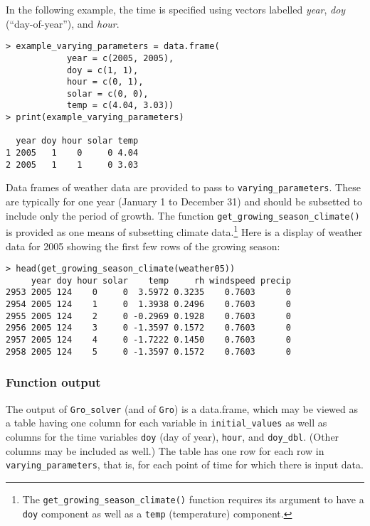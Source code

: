 \documentclass{article}
\newcommand{\code}[1]{\texttt{#1}}
\begin{document}
In the following example, the time is specified using vectors labelled
\emph{year}, \emph{doy} (``day-of-year''), and \emph{hour}.

\begin{center}
\begin{lstlisting}
> example_varying_parameters = data.frame(
            year = c(2005, 2005),
            doy = c(1, 1),
            hour = c(0, 1), 
            solar = c(0, 0),
            temp = c(4.04, 3.03))
> print(example_varying_parameters)

  year doy hour solar temp
1 2005   1    0     0 4.04
2 2005   1    1     0 3.03
\end{lstlisting}
\end{center}

Data frames of weather data are provided to pass to
\code{varying\_parameters}. These are typically for one year (January
1 to December 31) and should be subsetted to include only the period
of growth.  The function \code{get\_growing\_season\_climate()} is
provided as one means of subsetting climate data.\footnote{The
  \code{get\_growing\_season\_climate()} function requires its
  argument to have a \code{doy} component as well as a \code{temp}
  (temperature) component.}  Here is a display of weather data for
2005 showing the first few rows of the growing season:

\begin{center}
\begin{lstlisting}
> head(get_growing_season_climate(weather05))
     year doy hour solar    temp     rh windspeed precip
2953 2005 124    0     0  3.5972 0.3235    0.7603      0
2954 2005 124    1     0  1.3938 0.2496    0.7603      0
2955 2005 124    2     0 -0.2969 0.1928    0.7603      0
2956 2005 124    3     0 -1.3597 0.1572    0.7603      0
2957 2005 124    4     0 -1.7222 0.1450    0.7603      0
2958 2005 124    5     0 -1.3597 0.1572    0.7603      0
\end{lstlisting}
\end{center}

\subsubsection{Function output}
The output of \code{Gro\_solver} (and of \code{Gro}) is a data.frame,
which may be viewed as a table having one column for each variable in
\code{initial\_values} as well as columns for the time variables
\code{doy} (day of year), \code{hour}, and \code{doy\_dbl}.  (Other
columns may be included as well.)  The table has one row for each row
in \code{varying\_parameters}, that is, for each point of time for
which there is input data.
\end{document}
